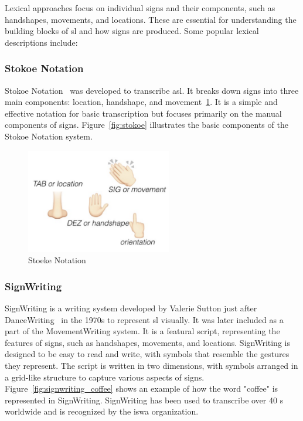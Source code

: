 \documentclass[../../main.tex]{subfiles}
\begin{document}
Lexical approaches focus on individual signs and their components, such as handshapes, movements, and locations. These are essential for understanding the building blocks of \gls{sl} and how signs are produced. Some popular lexical descriptions include:

\subsubsection{Stokoe Notation}
\label{ch:background_work:sign_language_descriptions:lexical_approaches:stokoe_notation}

Stokoe Notation~\cite{stokoe1980sign} was developed to transcribe \gls{asl}. It breaks down signs into three main components: location, handshape, and movement~\ref{fig:stoeke}. It is a simple and effective notation for basic transcription but focuses primarily on the manual components of signs. Figure~\ref{fig:stokoe} illustrates the basic components of the Stokoe Notation system.

\begin{figure}
  \centering \includegraphics[width = 2.5in]{chapters/background_work/images/stokoe.png}
  \caption{Stoeke Notation}
  \label{fig:stoeke}
\end{figure}

\subsubsection{SignWriting}
\label{ch:background_work:sign_language_descriptions:lexical_approaches:signwriting}

SignWriting is a writing system developed by Valerie Sutton just after DanceWriting~\cite{sutton1973sutton} in the 1970s to represent \gls{sl} visually. It was later included as a part of the MovementWriting system. It is a featural script, representing the features of signs, such as handshapes, movements, and locations. SignWriting is designed to be easy to read and write, with symbols that resemble the gestures they represent. The script is written in two dimensions, with symbols arranged in a grid-like structure to capture various aspects of signs. Figure~\ref{fig:signwriting_coffee} shows an example of how the word "coffee" is represented in SignWriting. SignWriting has been used to transcribe over 40 s worldwide and is recognized by the \gls{iswa} organization.
\end{document}
